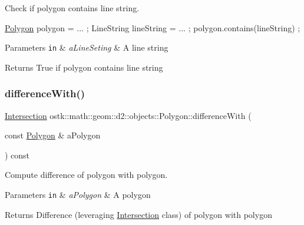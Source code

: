 Check if polygon contains line string. 


\begin{DoxyCode}
\hyperlink{classostk_1_1math_1_1geom_1_1d2_1_1objects_1_1_polygon_adaf9ef564754ab10ed3dd0d5fa0d90ea}{Polygon} polygon = ... ;
LineString lineString = ... ;
polygon.contains(lineString) ;
\end{DoxyCode}



\begin{DoxyParams}[1]{Parameters}
\mbox{\tt in}  & {\em a\+Line\+Seting} & A line string \\
\hline
\end{DoxyParams}
\begin{DoxyReturn}{Returns}
True if polygon contains line string 
\end{DoxyReturn}
\mbox{\label{classostk_1_1math_1_1geom_1_1d2_1_1objects_1_1_polygon_aaea6f04037e95bd70e4d6f0524f129e9}} 
\subsubsection{\texorpdfstring{difference\+With()}{differenceWith()}}
{\footnotesize\ttfamily \hyperlink{classostk_1_1math_1_1geom_1_1d2_1_1_intersection}{Intersection} ostk\+::math\+::geom\+::d2\+::objects\+::\+Polygon\+::difference\+With (\begin{DoxyParamCaption}\item[{const \hyperlink{classostk_1_1math_1_1geom_1_1d2_1_1objects_1_1_polygon}{Polygon} \&}]{a\+Polygon }\end{DoxyParamCaption}) const}



Compute difference of polygon with polygon. 


\begin{DoxyParams}[1]{Parameters}
\mbox{\tt in}  & {\em a\+Polygon} & A polygon \\
\hline
\end{DoxyParams}
\begin{DoxyReturn}{Returns}
Difference (leveraging \hyperlink{classostk_1_1math_1_1geom_1_1d2_1_1_intersection}{Intersection} class) of polygon with polygon 
\end{DoxyReturn}
\mbox{\label{classostk_1_1math_1_1geom_1_1d2_1_1objects_1_1_polygon_a82a1c0d6a76ee136829e0668bdd5c4a6}} 
